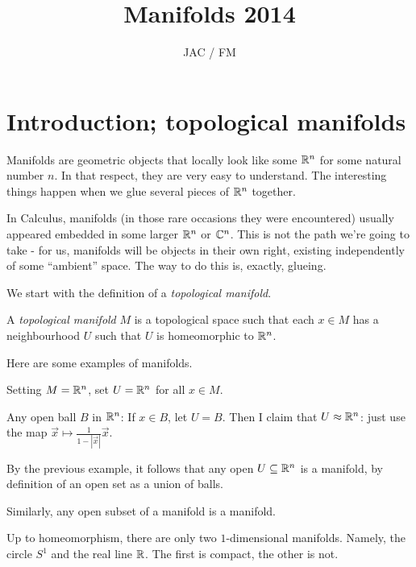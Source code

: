 \documentclass[11pt, english]{article}
\title{Manifolds 2014}
\author{JAC / FM}
\date{}
\begin{document}
\maketitle
\section{Introduction; topological manifolds}

Manifolds are geometric objects that locally look like some $\mathbb{R}^n$ for some natural number $n$. In that respect, they are very easy to understand. The interesting things happen when we glue several pieces of $\mathbb{R}^n$ together.

In Calculus, manifolds (in those rare occasions they were encountered) usually appeared embedded in some larger $\mathbb{R}^n$ or $\mathbb{C}^n$. This is not the path we're going to take - for us, manifolds will be objects in their own right, existing independently of some ``ambient'' space. The way to do this is, exactly, glueing.

We start with the definition of a \emph{topological manifold}.

\begin{defi}
A \emph{topological manifold} $M$ is a topological space such that each $x \in M$ has a neighbourhood $U$ such that $U$ is homeomorphic to $\mathbb{R}^n$.
\end{defi}

Here are some examples of manifolds.

\begin{example}
Setting $M=\mathbb{R}^n$, set $U=\mathbb{R}^n$ for all $x \in M$.
\end{example}

\begin{example}
Any open ball $B$ in $\mathbb{R}^n$: If $x \in B$, let $U=B$. Then I claim that $U \approx \mathbb{R}^n$: just use the map $\vec x \mapsto \frac{1}{1-|\vec x |} \vec x$.
\end{example}

\begin{example}
By the previous example, it follows that any open $U \subseteq \mathbb{R}^n$ is a manifold, by definition of an open set as a union of balls.
\end{example}

\begin{example}
Similarly, any open subset of a manifold is a manifold.
\end{example}

\begin{example}
Up to homeomorphism, there are only two $1$-dimensional manifolds. Namely, the circle $S^1$ and the real line $\mathbb{R}$. The first is compact, the other is not.
\end{example}
\end{document}
